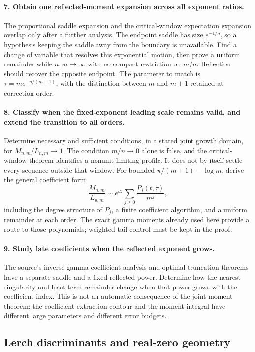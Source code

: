 \documentclass[11pt,letterpaper]{article}
\numberwithin{equation}{section}
\theoremstyle{plain}
\theoremstyle{definition}
\theoremstyle{remark}
\begin{document}
\paragraph{7. Obtain one reflected-moment expansion across all
exponent ratios.}
The proportional saddle expansion and the critical-window
expectation expansion overlap only after a further analysis.
The endpoint saddle has size $e^{-1/\lambda}$, so a hypothesis
keeping the saddle away from the boundary is unavailable.
Find a change of variable that resolves this exponential motion,
then prove a uniform remainder while $n,m\to\infty$ with no
compact restriction on $m/n$. Reflection should recover the
opposite endpoint. The parameter to match is
$\tau=m e^{-n/(m+1)}$, with the distinction between $m$ and
$m+1$ retained at correction order.

\paragraph{8. Classify when the fixed-exponent leading scale remains
valid, and extend the transition to all orders.}
Determine necessary and sufficient conditions, in a stated joint
growth domain, for $M_{n,m}/L_{n,m}\to1$.
The condition $m/n\to0$ alone is false, and the critical-window
theorem identifies a nonunit limiting profile. It does not by
itself settle every sequence outside that window.
For bounded $n/(m+1)-\log m$, derive the general coefficient form
\[
 \frac{M_{n,m}}{L_{n,m}}
 \sim e^{d\tau}\sum_{j\ge0}\frac{P_j(t,\tau)}{m^j},
\]
including the degree structure of $P_j$, a finite coefficient
algorithm, and a uniform remainder at each order.
The exact gamma moments already used here provide a route to
those polynomials; weighted tail control must be kept in the proof.

\paragraph{9. Study late coefficients when the reflected exponent
grows.}
The source's inverse-gamma coefficient analysis and optimal
truncation theorems have a separate saddle and a fixed reflected
power. Determine how the nearest singularity and least-term
remainder change when that power grows with the coefficient index.
This is not an automatic consequence of the joint moment theorem:
the coefficient-extraction contour and the moment integral have
different large parameters and different error budgets.

\subsection{Lerch discriminants and real-zero geometry}
\end{document}
